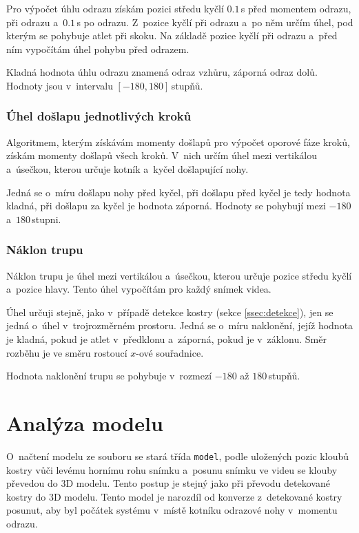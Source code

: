 Pro výpočet úhlu odrazu získám pozici středu kyčlí $0.1$\,\rm s před momentem odrazu, při odrazu a~$0.1$\,\rm s po odrazu. Z~pozice kyčlí při odrazu a~po něm určím úhel, pod kterým se pohybuje atlet při skoku. Na základě pozice kyčlí při odrazu a~před ním vypočítám úhel pohybu před odrazem.

Kladná hodnota úhlu odrazu znamená odraz vzhůru, záporná odraz dolů. Hodnoty jsou v~intervalu $[-180,180]$\,\rm stupňů.


\subsubsection{Úhel došlapu jednotlivých kroků}

Algoritmem, kterým získávám momenty došlapů pro výpočet oporové fáze kroků, získám momenty došlapů všech kroků. V~nich určím úhel mezi vertikálou a~úsečkou, kterou určuje kotník a~kyčel došlapující nohy.

Jedná se o~míru došlapu nohy před kyčel, při došlapu před kyčel je tedy hodnota kladná, při došlapu za kyčel je hodnota záporná. Hodnoty se pohybují mezi $-180$ a~$180$\,\rm stupni.


\subsubsection{Náklon trupu}

Náklon trupu je úhel mezi vertikálou a~úsečkou, kterou určuje pozice středu kyčlí a~pozice hlavy. Tento úhel vypočítám pro každý snímek videa.

Úhel určuji stejně, jako v~případě detekce kostry (sekce \ref{ssec:detekce}), jen se jedná o~úhel v~trojrozměrném prostoru. Jedná se o~míru naklonění, jejíž hodnota je kladná, pokud je atlet v~předklonu a~záporná, pokud je v~záklonu. Směr rozběhu je ve směru rostoucí $x$-ové souřadnice.

Hodnota naklonění trupu se pohybuje v~rozmezí $-180$ až $180$\,\rm stupňů.



\section{Analýza modelu}

O~načtení modelu ze souboru se stará třída \texttt{model}, podle uložených pozic kloubů kostry vůči levému hornímu rohu snímku a~posunu snímku ve videu se klouby převedou do 3D modelu. Tento postup je stejný jako při převodu detekované kostry do 3D modelu. Tento model je narozdíl od konverze z~detekované kostry posunut, aby byl počátek systému v~místě kotníku odrazové nohy v~momentu odrazu.

